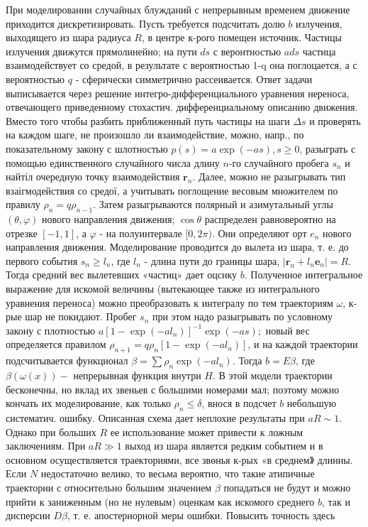\documentclass[10pt]{article}
\begin{document}
При моделировании случайных блужданий с непрерывным временем движение приходится дискретизировать. Пусть требуется подсчитать долю $b$ излучения, выходящего из шара радиуса $R$, в центре к-рого помещен источник. Частицы излучения движутся прямолинейно; на пути $d s$ с веронтностью $a d s$ частица взаимодействует со средой, в результате с вероятностью 1-q она поглоцается, а с вероятностью $q$ - сферически симметрично рассеивается. Ответ задачи выписывается через решение интегро-дифференциального уравнения нереноса, отвечающего приведенному стохастич. дифференциальному описанию движения. Вместо того чтобы разбить приближенный путь частицы на шаги $\Delta s$ и проверять на каждом шаге, не произошло ли взаимодействие, можно, напр., по показательному закону с шлотностью $p(s)=a \exp (-a s), s \geqslant 0$, разыграть с помощью единственного случайного числа длину $n$-го случайного пробега $s_{n}$ и найтіл очередную точку взаимодействия $\boldsymbol{r}_{n}$. Далее, можно не разыгрывать тип взаігмодействия со средої, а учитывать поглощение весовым множителем по правилу $\rho_{n}=q \rho_{n-1}$. Затем разыгрываются полярный и азимутальный углы $(\theta, \varphi)$ нового направления движения; $\cos \theta$ распределен равновероятно на отрезке $[-1,1]$, а $\varphi$ - на полуинтервале $[0,2 \pi)$. Они определяют орт $e_{n}$ нового направления движения. Моделирование проводится до вылета из шара, т. е. до первого события $s_{n} \geqslant l_{n}$, где $l_{n}$ - длина пути до границы шара, $\left|\boldsymbol{r}_{n}+l_{n} \boldsymbol{e}_{n}\right|=R$. Тогда средний вес вылетевших «частиц» дает оцснку $b$. Полученное интегральное выражение для искомой величины (вытекающее также из интегрального уравнения переноса) можно преобразовать к интегралу по тем траекториям $\omega$, к-рые шар не покидают. Пробег $s_{n}$ при этом надо разыгрывать по условному закону с плотностью $a\left[1-\exp \left(-a l_{n}\right)\right]^{-1} \exp (-a s) ;$ новый вес определяется правилом $\rho_{n+1}=q \rho_{n}\left[1-\exp \left(-a l_{n}\right)\right]$, и на каждой траектории подсчитывается функционал $\beta=\sum \rho_{n} \exp \left(-a l_{n}\right)$. Тогда $b=E \beta$, где $\beta(\omega(x))-$ непрерывная функция внутри $H$. В этой модели траектории бесконечны, но вклад их звеньев с большими номерами мал; поэтому можно кончать их моделирование, как только $\rho_{n} \leqslant \delta$, внося в подсчет $b$ небольшую систематич. ошибку. Описанная схема дает неплохие результаты при $a R \sim 1$. Однако при больших $R$ ее использование может привести к ложным заключениям. При $a R \gg 1$ выход из шара является редким событием и в основном осуществляется траекториями, все звөнья к-рых «в среднем》 длинны. Если $N$ недостаточно велико, то весьма вероятно, что такие атипичные траектории с относительно большим значением $\beta$ попадаться не будут и можно прийти к заниженным (но не нулевым) оценкам как искомого среднего $b$, так и дисперсии $D \beta$, т. $е$. апостериорной меры ошибки. Повысить точность здесь
\end{document}
